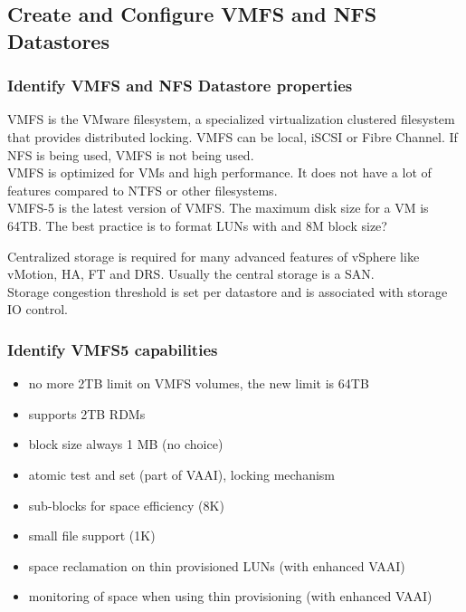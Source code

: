 \subsection{Create and Configure VMFS and NFS Datastores}

\subsubsection{Identify VMFS and NFS Datastore properties}

VMFS is the VMware filesystem, a specialized virtualization clustered
filesystem that provides distributed locking. VMFS can be local, iSCSI or
Fibre Channel. If NFS is being used, VMFS is not being used.\\

VMFS is optimized for VMs and high performance. It does not have a lot of
features compared to NTFS or other filesystems.\\

VMFS-5 is the latest version of VMFS. The maximum disk size for a VM is
64TB. The best practice is to format LUNs with and 8M block size?

Centralized storage is required for many advanced features of vSphere like
vMotion, HA, FT and DRS. Usually the central storage is a SAN.\\

Storage congestion threshold is set per datastore and is associated with
storage IO control.

\subsubsection{Identify VMFS5 capabilities}

\begin{itemize}

\item no more 2TB limit on VMFS volumes, the new limit is 64TB
\item supports 2TB RDMs
\item block size always 1 MB (no choice)
\item atomic test and set (part of VAAI), locking mechanism
\item sub-blocks for space efficiency (8K)
\item small file support (1K)
\item space reclamation on thin provisioned LUNs (with enhanced VAAI)
\item monitoring of space when using thin provisioning (with enhanced VAAI)

\end{itemize}

